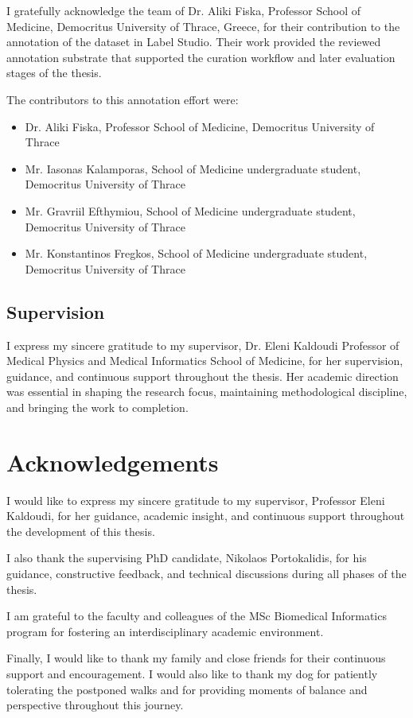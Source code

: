 I gratefully acknowledge the team of Dr. Aliki Fiska, Professor School of Medicine, Democritus University of Thrace, Greece, for their contribution to the annotation of the dataset in Label Studio. Their work provided the reviewed annotation substrate that supported the curation workflow and later evaluation stages of the thesis.

The contributors to this annotation effort were:

\begin{itemize}
    \item Dr. Aliki Fiska, Professor School of Medicine, Democritus University of Thrace
    \item Mr. Iasonas Kalamporas, School of Medicine undergraduate student, Democritus University of Thrace
    \item Mr. Gravriil Efthymiou, School of Medicine undergraduate student, Democritus University of Thrace
    \item Mr. Konstantinos Fregkos, School of Medicine undergraduate student, Democritus University of Thrace
\end{itemize}

\section*{Supervision}

I express my sincere gratitude to my supervisor, Dr. Eleni Kaldoudi Professor of Medical Physics and Medical Informatics School of Medicine, for her supervision, guidance, and continuous support throughout the thesis. Her academic direction was essential in shaping the research focus, maintaining methodological discipline, and bringing the work to completion.

\clearpage

\chapter*{Acknowledgements}

I would like to express my sincere gratitude to my supervisor, Professor Eleni Kaldoudi, for her guidance, academic insight, and continuous support throughout the development of this thesis.

I also thank the supervising PhD candidate, Nikolaos Portokalidis, for his guidance, constructive feedback, and technical discussions during all phases of the thesis.

I am grateful to the faculty and colleagues of the MSc Biomedical Informatics program for fostering an interdisciplinary academic environment.

Finally, I would like to thank my family and close friends for their continuous support and encouragement. I would also like to thank my dog for patiently tolerating the postponed walks and for providing moments of balance and perspective throughout this journey.

\clearpage
